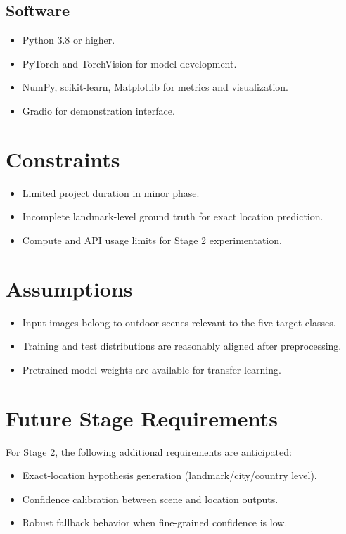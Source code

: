 \subsection{Software}
\begin{itemize}
\item Python 3.8 or higher.
\item PyTorch and TorchVision for model development.
\item NumPy, scikit-learn, Matplotlib for metrics and visualization.
\item Gradio for demonstration interface.
\end{itemize}

\section{Constraints}
\begin{itemize}
\item Limited project duration in minor phase.
\item Incomplete landmark-level ground truth for exact location prediction.
\item Compute and API usage limits for Stage 2 experimentation.
\end{itemize}

\section{Assumptions}
\begin{itemize}
\item Input images belong to outdoor scenes relevant to the five target classes.
\item Training and test distributions are reasonably aligned after preprocessing.
\item Pretrained model weights are available for transfer learning.
\end{itemize}

\section{Future Stage Requirements}
For Stage 2, the following additional requirements are anticipated:
\begin{itemize}
\item Exact-location hypothesis generation (landmark/city/country level).
\item Confidence calibration between scene and location outputs.
\item Robust fallback behavior when fine-grained confidence is low.
\end{itemize}

